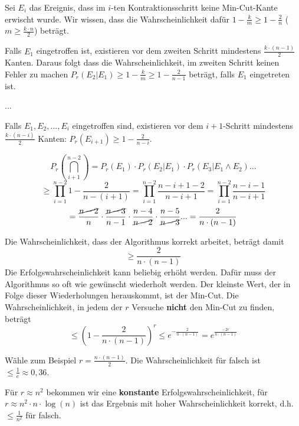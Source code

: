 \documentclass{scrartcl}%
\begin{document}
    Sei $E_i$ das Ereignis, dass im $i$-ten Kontraktionsschritt keine Min-Cut-Kante erwischt wurde.
    Wir wissen, dass die Wahrscheinlichkeit dafür $1-\frac{k}{m} \geq 1 - \frac{2}{n}$
    ($m \geq \frac{k \cdot n}{2}$) beträgt.

    Falls $E_1$ eingetroffen ist, existieren vor dem zweiten Schritt mindestens $\frac{k \cdot (n-1)}{2}$ Kanten.
    Daraus folgt dass die Wahrscheinlichkeit, im zweiten Schritt keinen Fehler zu machen
    $P_r(E_2 | E_1) \geq 1 - \frac{k}{m} \geq 1 - \frac{2}{n-1}$ beträgt, falls $E_1$ eingetreten ist.

    ...

    Falls $E_1, E_2, ..., E_i$ eingetroffen sind, existieren vor dem $i+1$-Schritt mindestens $\frac{k \cdot (n-i)}{2}$ Kanten:
    $P_r(E_{i+1})  \geq 1 - \frac{2}{n-i}$.

    \begin{equation*}
        P_r(\bigcap_{i+1}^{n-2}) = P_r(E_1) \cdot P_r(E_2|E_1) \cdot P_r(E_3| E_1 \land E_2) ...
    \end{equation*}
    \begin{equation*}
        \geq \prod_{i=1}^{n-2}1-\frac{2}{n - (i+1)} = \prod_{i=1}^{n-2}\frac{n-i+1-2}{n-i+1} = \prod_{i=1}^{n-2}\frac{n-i-1}{n-i+1}
    \end{equation*}
    \begin{equation*}
        = \frac{\cancel{n-2}}{n} \cdot \frac{\cancel{n-3}}{n-1} \cdot \frac{n-4}{\cancel{n-2}} \cdot \frac{n-5}{\cancel{n-3}} ... = \frac{2}{n \cdot (n-1)}
    \end{equation*}

    Die Wahrscheinlichkeit, dass der Algorithmus korrekt arbeitet, beträgt damit
    \begin{equation*}
        \geq \frac{2}{n \cdot (n-1)}
    \end{equation*}
    Die Erfolgswahrscheinlichkeit kann beliebig erhöht werden.
    Dafür muss der Algorithmus so oft wie gewünscht wiederholt werden.
    Der kleinste Wert, der in Folge dieser Wiederholungen herauskommt, ist der Min-Cut.
    Die Wahrscheinlichkeit, in jedem der $r$ Versuche \textbf{nicht}
    den Min-Cut zu finden, beträgt
    \begin{equation*}
        \leq (1 - \frac{2}{n \cdot (n-1)})^r \leq e^{-\frac{2}{n \cdot (n-1)}} = e^{\frac{-2r}{n \cdot (n-1)}}
    \end{equation*}

    Wähle zum Beispiel $r = \frac{n \cdot (n-1)}{2}$.
    Die Wahrscheinlichkeit für falsch ist $\leq \frac{1}{e} \approx 0,36$.

    Für $r \approx n^2$ bekommen wir eine \textbf{konstante} Erfolgswahrscheinlichkeit,
    für $r \approx n^2 \cdot n \cdot \log(n)$ ist das Ergebnis mit hoher Wahrscheinlichkeit korrekt, d.h. $\leq \frac{1}{n^2}$ für falsch.
\end{document}
